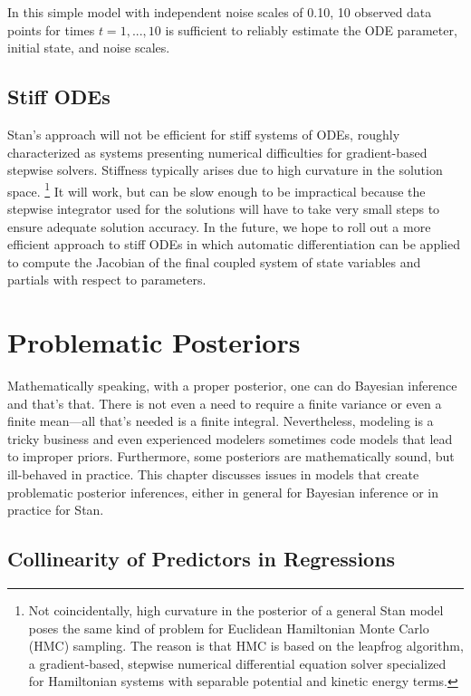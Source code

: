 In this simple model with independent noise scales of 0.10, 10
observed data points for times $t = 1, ..., 10$ is sufficient to
reliably estimate the ODE parameter, initial state, and noise scales.



\section{Stiff ODEs}

Stan's approach will not be efficient for stiff systems of ODEs,
roughly characterized as systems presenting numerical difficulties for
gradient-based stepwise solvers.  Stiffness typically arises due to high
curvature in the solution space.%
%
\footnote{Not coincidentally, high curvature in the posterior of a
  general Stan model poses the same kind of problem for Euclidean
  Hamiltonian Monte Carlo (HMC) sampling.  The reason is that HMC is
  based on the leapfrog algorithm, a gradient-based, stepwise
  numerical differential equation solver specialized for Hamiltonian
  systems with separable potential and kinetic energy terms.}
%
It will work, but can be slow enough to be impractical because the
stepwise integrator used for the solutions will have to take very
small steps to ensure adequate solution accuracy.  In the future, we hope to
roll out a more efficient approach to stiff ODEs in which automatic
differentiation can be applied to compute the Jacobian of the final
coupled system of state variables and partials with respect to
parameters.


\chapter{Problematic Posteriors}\label{problematic-posteriors.chapter}%
\noindent
Mathematically speaking, with a proper posterior, one can do Bayesian
inference and that's that. There is not even a need to require a
finite variance or even a finite mean---all that's needed is a finite
integral.  Nevertheless, modeling is a tricky business and even
experienced modelers sometimes code models that lead to improper
priors.  Furthermore, some posteriors are mathematically sound, but
ill-behaved in practice.  This chapter discusses issues in models that
create problematic posterior inferences, either in general for
Bayesian inference or in practice for Stan.


\section{Collinearity of Predictors in Regressions}\label{collinearity.section}

